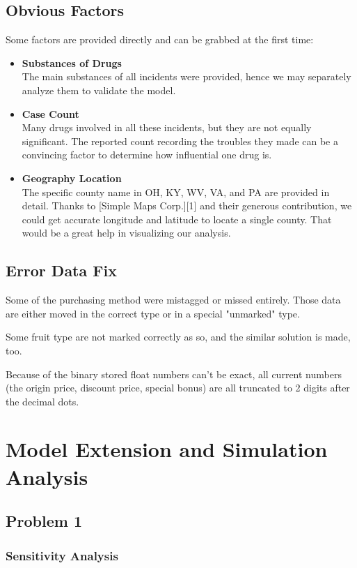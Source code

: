 \documentclass{mcmthesis}
\begin{document}
\subsection{Obvious Factors}
Some factors are provided directly and can be grabbed at the first time:
\begin{itemize}
	\item \textbf{Substances of Drugs}\\
	The main substances of all incidents were provided, hence we may separately analyze them to validate the model.
	\item \textbf{Case Count}\\
	Many drugs involved in all these incidents, but they are not equally significant. The reported count recording the troubles they made can be a convincing factor to determine how influential one drug is.
	\item \textbf{Geography Location}\\
	The specific county name in OH, KY, WV, VA, and PA are provided in detail. Thanks to [Simple Maps Corp.][1] and their generous contribution, we could get accurate longitude and latitude to locate a single county. That would be a great help in visualizing our analysis.
\end{itemize}



\subsection{Error Data Fix}

Some of the purchasing method were mistagged or missed entirely. Those data are either moved in the correct type or in a special "unmarked" type.

Some fruit type are not marked correctly as so, and the similar solution is made, too.

Because of the binary stored float numbers can't be exact, all current numbers (the origin price, discount price, special bonus) are all truncated to 2 digits after the decimal dots.
\section{Model Extension and Simulation Analysis}
\subsection{Problem 1}

\subsubsection{Sensitivity Analysis}
\end{document}
